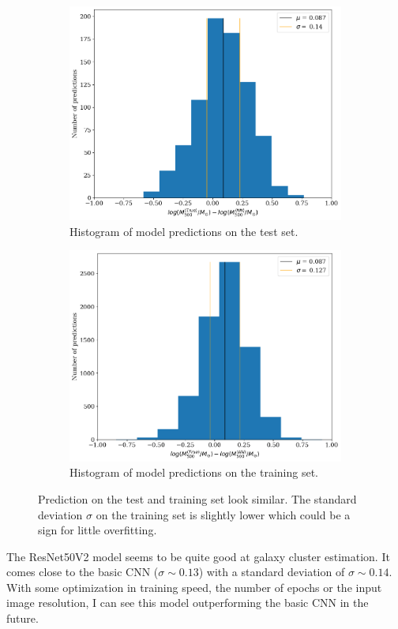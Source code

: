 \begin{figure}[H]
\begin{subfigure}{.46\textwidth}
  \centering
  \includegraphics[width=\linewidth]{images/Chapter4/Res50V2/resnet50v2_test_hist.png}
  \caption{Histogram of model predictions on the test set.}
  \label{fig:best_perf_resnet50v2_c}
\end{subfigure}%
\hspace{.6em}
\begin{subfigure}{.46\textwidth}
  \centering
  \includegraphics[width=\linewidth]{images/Chapter4/Res50V2/resnet50v2_training_hist.png}
  \caption{Histogram of model predictions on the training set.}
  \label{fig:best_perf_resnet50v2_d}
\end{subfigure}
\caption{Prediction on the test and training set look similar. The standard deviation $\sigma$ on the training set is slightly lower which could be a sign for little overfitting.} 
\label{fig:best_perf_resnet50v2}
\end{figure}

The ResNet50V2 model seems to be quite good at galaxy cluster estimation. It comes close to the basic CNN ($\sigma \sim 0.13$) with a standard deviation of $\sigma \sim 0.14$. With some optimization in training speed, the number of epochs or the input image resolution, I can see this model outperforming the basic CNN in the future. 